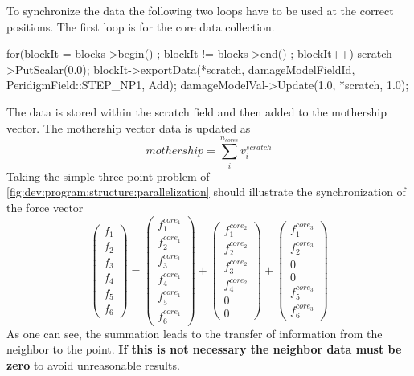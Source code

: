 To synchronize the data the following two loops have to be used at the correct positions. The first loop is for the core data collection.
\begingroup
\lstset{breaklines=true}
\begin{code}
 for(blockIt = blocks->begin() ; blockIt != blocks->end() ; blockIt++){
        scratch->PutScalar(0.0);           
        blockIt->exportData(*scratch, damageModelFieldId, PeridigmField::STEP_NP1, Add);
        damageModelVal->Update(1.0, *scratch, 1.0);
  }
\end{code}
\endgroup
The data is stored within the scratch field and then added to the mothership vector. The mothership vector data is updated as
\begin{equation}
   mothership = \sum_i^{n_{cores}} v^{scratch}_i
\end{equation}
Taking the simple three point problem of \autoref{fig:dev:program:structure:parallelization} should illustrate the synchronization of the force vector
\begin{equation}
   \left(\begin{matrix}
    f_{1} \\
    f_{2} \\
    f_{3} \\
    f_{4} \\
    f_{5} \\
    f_{6} 
   \end{matrix}\right) = 
      \left(\begin{matrix}
    f_{1}^{core_1} \\
    f_{2}^{core_1} \\
    f_{3}^{core_1} \\
    f_{4}^{core_1} \\
    f_{5}^{core_1} \\
    f_{6}^{core_1} 
   \end{matrix}\right) +
      \left(\begin{matrix}
    f_{1}^{core_2} \\
    f_{2}^{core_2} \\
    f_{3}^{core_2} \\
    f_{4}^{core_2} \\
    0 \\
    0 
   \end{matrix}\right) +
      \left(\begin{matrix}
    f_{1}^{core_3} \\
    f_{2}^{core_3} \\
    0 \\
    0 \\
    f_{5}^{core_3} \\
    f_{6}^{core_3} 
   \end{matrix}\right)
\end{equation}
As one can see, the summation leads to the transfer of information from the neighbor to the point. \textbf{If this is not necessary the neighbor data must be zero} to avoid unreasonable results.

